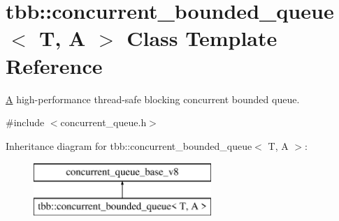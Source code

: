 \hypertarget{classtbb_1_1concurrent__bounded__queue}{}\section{tbb\+:\+:concurrent\+\_\+bounded\+\_\+queue$<$ T, A $>$ Class Template Reference}
\label{classtbb_1_1concurrent__bounded__queue}


\hyperlink{structA}{A} high-\/performance thread-\/safe blocking concurrent bounded queue.  




{\ttfamily \#include $<$concurrent\+\_\+queue.\+h$>$}

Inheritance diagram for tbb\+:\+:concurrent\+\_\+bounded\+\_\+queue$<$ T, A $>$\+:\begin{figure}[H]
\begin{center}
\leavevmode
\includegraphics[height=2.000000cm]{classtbb_1_1concurrent__bounded__queue}
\end{center}
\end{figure}
